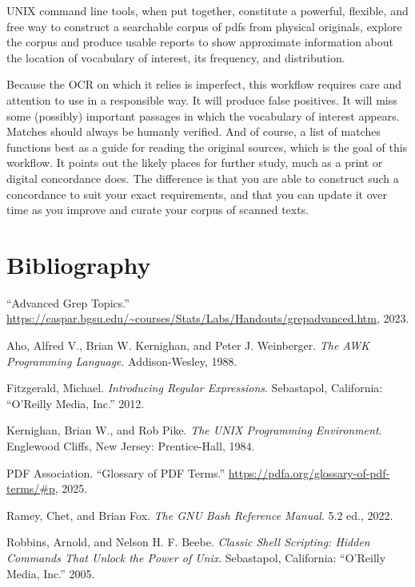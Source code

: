 \documentclass[
  letterpaper,
]{tufte-handout}
\newlength{\cslhangindent}
\newenvironment{CSLReferences}[2] %
 {\begin{list}{}{%
  \setlength{\itemindent}{0pt}
  \setlength{\leftmargin}{0pt}
  \setlength{\parsep}{0pt}
  \ifodd #1
   \setlength{\leftmargin}{\cslhangindent}
   \setlength{\itemindent}{-1\cslhangindent}
  \fi
  \setlength{\itemsep}{#2\baselineskip}}}
 {\end{list}}
\begin{document}
UNIX command line tools, when put together, constitute a powerful,
flexible, and free way to construct a searchable corpus of pdfs from
physical originals, explore the corpus and produce usable reports to
show approximate information about the location of vocabulary of
interest, its frequency, and distribution.

Because the OCR on which it relies is imperfect, this workflow requires
care and attention to use in a responsible way. It will produce false
positives. It will miss some (possibly) important passages in which the
vocabulary of interest appears. Matches should always be humanly
verified. And of course, a list of matches functions best as a guide for
reading the original sources, which is the goal of this workflow. It
points out the likely places for further study, much as a print or
digital concordance does. The difference is that you are able to
construct such a concordance to suit your exact requirements, and that
you can update it over time as you improve and curate your corpus of
scanned texts.

\clearpage

\section*{Bibliography}\label{bibliography}

\label{refs}
\begin{CSLReferences}{1}{0}
{``Advanced Grep Topics.''}
\url{https://caspar.bgsu.edu/~courses/Stats/Labs/Handouts/grepadvanced.htm},
2023.

Aho, Alfred V., Brian W. Kernighan, and Peter J. Weinberger. \emph{The
AWK Programming Language}. Addison-Wesley, 1988.

Fitzgerald, Michael. \emph{Introducing Regular Expressions}. Sebastapol,
California: {``O'Reilly Media, Inc.''} 2012.

Kernighan, Brian W., and Rob Pike. \emph{The UNIX Programming
Environment}. Englewood Cliffs, New Jersey: Prentice-Hall, 1984.

PDF Association. {``Glossary of PDF Terms.''}
\url{https://pdfa.org/glossary-of-pdf-terms/\#p}, 2025.

Ramey, Chet, and Brian Fox. \emph{The GNU Bash Reference Manual}. 5.2
ed., 2022.

Robbins, Arnold, and Nelson H. F. Beebe. \emph{Classic Shell Scripting:
Hidden Commands That Unlock the Power of Unix}. Sebastapol, California:
{``O'Reilly Media, Inc.''} 2005.

\end{CSLReferences}
\end{document}
